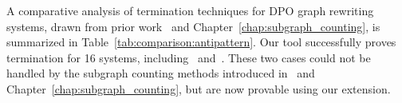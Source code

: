 A comparative analysis of termination techniques for DPO graph rewriting systems, drawn from prior work~\cite{plump1995ontermination,plump2018modular,bruggink2014termination,bruggink2015proving,endrullis2024generalized_arxiv_v2,
overbeek2024termination_lmcs} and Chapter~\ref{chap:subgraph_counting}, is summarized in Table~\ref{tab:comparison:antipattern}. 
Our tool successfully proves termination for 16 systems, including~\cite[Example D.3]{endrullis2024generalized_arxiv_v2} and~\cite[Example 1]{bruggink2014termination}. These two cases could not be handled by the subgraph counting methods introduced in~\cite{overbeek2024termination_lmcs} and Chapter~\ref{chap:subgraph_counting}, but are now provable using our extension.
